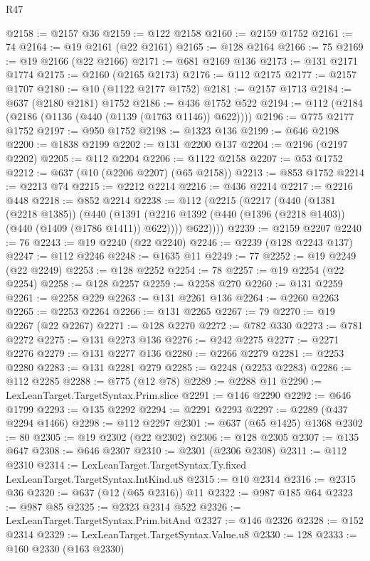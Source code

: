 \begin{lexlean}{R47}
\begin{coremodule}
@2158 := @2157 @36
@2159 := @122 @2158
@2160 := @2159 @1752
@2161 := 74
@2164 := @19 @2161 (@22 @2161)
@2165 := @128 @2164
@2166 := 75
@2169 := @19 @2166 (@22 @2166)
@2171 := @681 @2169 @136
@2173 := @131 @2171 @1774
@2175 := @2160 (@2165 @2173)
@2176 := @112 @2175
@2177 := @2157 @1707
@2180 := @10 (@1122 @2177 @1752)
@2181 := @2157 @1713
@2184 := @637 (@2180 @2181) @1752
@2186 := @436 @1752 @522
@2194 := @112 (@2184 (@2186 (@1136 (@440 (@1139 (@1763 @1146)) @622))))
@2196 := @775 @2177 @1752
@2197 := @950 @1752
@2198 := @1323 @136
@2199 := @646 @2198
@2200 := @1838 @2199
@2202 := @131 @2200 @137
@2204 := @2196 (@2197 @2202)
@2205 := @112 @2204
@2206 := @1122 @2158
@2207 := @53 @1752
@2212 := @637 (@10 (@2206 @2207) (@65 @2158))
@2213 := @853 @1752
@2214 := @2213 @74
@2215 := @2212 @2214
@2216 := @436 @2214
@2217 := @2216 @448
@2218 := @852 @2214
@2238 := @112
    (@2215
      (@2217
        (@440
          (@1381 (@2218 @1385))
          (@440
            (@1391 (@2216 @1392 (@440 (@1396 (@2218 @1403)) (@440 (@1409 (@1786 @1411)) @622))))
            @622))))
@2239 := @2159 @2207
@2240 := 76
@2243 := @19 @2240 (@22 @2240)
@2246 := @2239 (@128 @2243 @137)
@2247 := @112 @2246
@2248 := @1635 @11
@2249 := 77
@2252 := @19 @2249 (@22 @2249)
@2253 := @128 @2252
@2254 := 78
@2257 := @19 @2254 (@22 @2254)
@2258 := @128 @2257
@2259 := @2258 @270
@2260 := @131 @2259
@2261 := @2258 @229
@2263 := @131 @2261 @136
@2264 := @2260 @2263
@2265 := @2253 @2264
@2266 := @131 @2265
@2267 := 79
@2270 := @19 @2267 (@22 @2267)
@2271 := @128 @2270
@2272 := @782 @330
@2273 := @781 @2272
@2275 := @131 @2273 @136
@2276 := @242 @2275
@2277 := @2271 @2276
@2279 := @131 @2277 @136
@2280 := @2266 @2279
@2281 := @2253 @2280
@2283 := @131 @2281 @279
@2285 := @2248 (@2253 @2283)
@2286 := @112 @2285
@2288 := @775 (@12 @78)
@2289 := @2288 @11
@2290 := LexLeanTarget.TargetSyntax.Prim.slice
@2291 := @146 @2290
@2292 := @646 @1799
@2293 := @135 @2292
@2294 := @2291 @2293
@2297 := @2289 (@437 @2294 @1466)
@2298 := @112 @2297
@2301 := @637 (@65 @1425) @1368
@2302 := 80
@2305 := @19 @2302 (@22 @2302)
@2306 := @128 @2305
@2307 := @135 @647
@2308 := @646 @2307
@2310 := @2301 (@2306 @2308)
@2311 := @112 @2310
@2314 := LexLeanTarget.TargetSyntax.Ty.fixed LexLeanTarget.TargetSyntax.IntKind.u8
@2315 := @10 @2314
@2316 := @2315 @36
@2320 := @637 (@12 (@65 @2316)) @11
@2322 := @987 @185 @64
@2323 := @987 @85
@2325 := @2323 @2314 @522
@2326 := LexLeanTarget.TargetSyntax.Prim.bitAnd
@2327 := @146 @2326
@2328 := @152 @2314
@2329 := LexLeanTarget.TargetSyntax.Value.u8
@2330 := 128
@2333 := @160 @2330 (@163 @2330)

\end{coremodule}
\end{lexlean}
